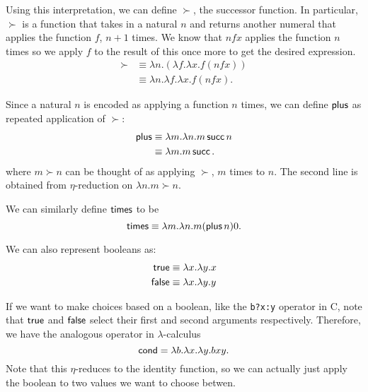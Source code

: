 \documentclass[class=scrartcl]{standalone}
\begin{document}
Using this interpretation, we can define \(\succ\), the successor function.
In particular, \(\succ\) is a function that takes in a natural \(n\)
and returns another numeral that applies the function \(f\), \(n + 1\) times.
We know that \(n f x\) applies the function \(n\) times so
we apply \(f\) to the result of this once more to get the desired expression.
\begin{align*}
  \succ &\equiv \lambda n. (\lambda f. \lambda x. f (n f x)) \\
        &\equiv \lambda n. \lambda f. \lambda x. f (n f x).
\end{align*}

Since a natural \(n\) is encoded as applying a function \(n\) times,
we can define \(\operatorname{\textsf{plus}}\) as repeated application of \(\succ\):
\begin{align*}
  \operatorname{\textsf{plus}} &\equiv \lambda m. \lambda n. m \operatorname{\textsf{succ}} n \\
              &\equiv \lambda m. m \operatorname{\textsf{succ}}.
\end{align*}
where \(m \succ n\) can be thought of as applying \(\succ\),
\(m\) times to \(n\).
The second line is obtained from \(\eta\)-reduction
on \(\lambda n. m \succ n\).

We can similarly define \(\operatorname{\textsf{times}}\) to be
\[
  \operatorname{\textsf{times}} \equiv \lambda m. \lambda n. m (\operatorname{\textsf{plus}} n) 0.
\]


We can also represent booleans as:
\begin{align*}
  \operatorname{\textsf{true}} &\equiv \lambda x. \lambda y. x \\
  \operatorname{\textsf{false}} &\equiv \lambda x. \lambda y. y
\end{align*}

If we want to make choices based on a boolean,
like the \texttt{b?x:y} operator in C,
note that \(\operatorname{\textsf{true}}\) and \(\operatorname{\textsf{false}}\) select
their first and second arguments respectively.
Therefore, we have the analogous operator in \(\lambda\)-calculus
\[
  \operatorname{\textsf{cond}} = \lambda b. \lambda x. \lambda y. b x y.
\]
Note that this \(\eta\)-reduces to the identity function,
so we can actually just apply the boolean
to two values we want to choose betwen.
\end{document}
